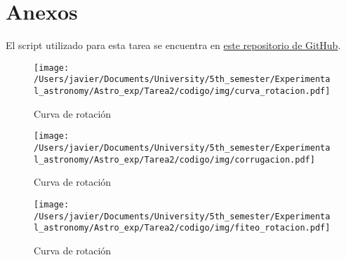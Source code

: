 \documentclass[letterpaper,oneside]{article}
\begin{document}
\section{Anexos}
El script utilizado para esta tarea se encuentra en \href{https://github.com/Wenupi/Astro_exp}{este repositorio de GitHub}.

\begin{figure}[H]
    \centering
    \texttt{[image: /Users/javier/Documents/University/5th\_semester/Experimental\_astronomy/Astro\_exp/Tarea2/codigo/img/curva\_rotacion.pdf]}
    \caption{Curva de rotación}
    \label{fig:curva-rotacion}
\end{figure}

\begin{figure}[H]
    \centering
    \texttt{[image: /Users/javier/Documents/University/5th\_semester/Experimental\_astronomy/Astro\_exp/Tarea2/codigo/img/corrugacion.pdf]}
    \caption{Curva de rotación}
    \label{fig:corrugacion}
\end{figure}

\begin{figure}[H]
    \centering
    \texttt{[image: /Users/javier/Documents/University/5th\_semester/Experimental\_astronomy/Astro\_exp/Tarea2/codigo/img/fiteo\_rotacion.pdf]}
    \caption{Curva de rotación}
    \label{fig:fit-curva-rotacion}
\end{figure}



\end{document}
